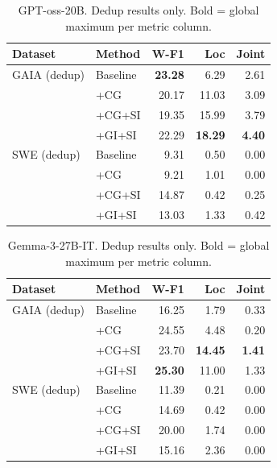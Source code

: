\begin{table}[h]
\centering\small
\begin{tabular}{ll rrr}
\toprule
\textbf{Dataset} & \textbf{Method} & \textbf{W-F1} & \textbf{Loc} & \textbf{Joint} \\
\midrule
GAIA (dedup)  & Baseline  & \textbf{23.28} &  6.29 &  2.61 \\
              & +CG       & 20.17 & 11.03 &  3.09 \\
              & +CG+SI    & 19.35 & 15.99 &  3.79 \\
              & +GI+SI    & 22.29 & \textbf{18.29} & \textbf{4.40} \\
\midrule
SWE (dedup)   & Baseline  &  9.31 &  0.50 &  0.00 \\
              & +CG       &  9.21 &  1.01 &  0.00 \\
              & +CG+SI    & 14.87 &  0.42 &  0.25 \\
              & +GI+SI    & 13.03 &  1.33 &  0.42 \\
\bottomrule
\end{tabular}
\caption{GPT-oss-20B. Dedup results only.
  Bold = global maximum per metric column.}
\end{table}


\begin{table}[h]
\centering\small
\begin{tabular}{ll rrr}
\toprule
\textbf{Dataset} & \textbf{Method} & \textbf{W-F1} & \textbf{Loc} & \textbf{Joint} \\
\midrule
GAIA (dedup)  & Baseline  & 16.25 &  1.79 &  0.33 \\
              & +CG       & 24.55 &  4.48 &  0.20 \\
              & +CG+SI    & 23.70 & \textbf{14.45} & \textbf{1.41} \\
              & +GI+SI    & \textbf{25.30} & 11.00 &  1.33 \\
\midrule
SWE (dedup)   & Baseline  & 11.39 &  0.21 &  0.00 \\
              & +CG       & 14.69 &  0.42 &  0.00 \\
              & +CG+SI    & 20.00 &  1.74 &  0.00 \\
              & +GI+SI    & 15.16 &  2.36 &  0.00 \\
\bottomrule
\end{tabular}
\caption{Gemma-3-27B-IT. Dedup results only.
  Bold = global maximum per metric column.}
\end{table}
